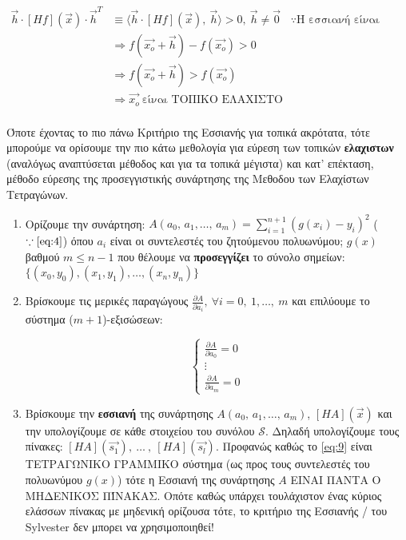 \documentclass[12pt]{article}
\begin{document}
\begin{align*}
\vec{h} \cdot [Hf](\vec{x}) \cdot \vec{h}^T &\equiv \langle \vec{h} \cdot [Hf](\vec{x}), \ \vec{h} \rangle > 0, \ \vec{h} \neq \vec{0}  & \because \text{Η εσσιανή είναι θετικά ορισμένη} \\  &\Rightarrow f(\vec{x_o}+\vec{h})-f(\vec{x_o})>0 \\
&\Rightarrow f(\vec{x_o}+\vec{h})>f(\vec{x_o}) \\
&\Rightarrow \vec{x_o} \ \text{είναι ΤΟΠΙΚΟ ΕΛΑΧΙΣΤΟ} \\
\end{align*}

    Όποτε έχοντας το πιο πάνω Κριτήριο της Εσσιανής για τοπικά ακρότατα,
τότε μπορούμε να ορίσουμε την πιο κάτω μεθολογία για εύρεση των τοπικών
\textbf{ελαχιστων} (αναλόγως αναπτύσεται μέθοδος και για τα τοπικά
μέγιστα) και κατ' επέκταση, μέθοδο εύρεσης της προσεγγιστικής συνάρτησης
της Μεθοδου των Ελαχίστων Τετραγώνων.

    

    \begin{enumerate}
\def\labelenumi{\arabic{enumi}.}
\item
  Ορίζουμε την συνάρτηση:
  \(A(a_0, \, a_1,\dots, \, a_m)=\sum_{i=1}^{n+1} (g(x_i)-y_i)^2\)
  (\(\because \eqref{eq:4}\)) όπου \(a_i\) είναι οι συντελεστές του
  ζητούμενου πολυωνύμου; \(g(x)\) βαθμού \(m\leq n-1\) που θέλουμε να
  \textbf{προσεγγίζει} το σύνολο σημείων:
  \(\{(x_0,y_0),(x_1,y_1),\dots,(x_{n},y_{n})\}\)
\item
  Βρίσκουμε τις μερικές παραγώγους
  \(\frac{\partial A}{\partial a_i}, \ \forall i=0, \ 1, \dots, \ m\)
  και επιλύουμε το σύστημα (\(m+1\))-εξισώσεων:

\[
  \begin{cases}
   \frac{\partial A}{\partial a_0}=0 \\
   \vdots \\
   \frac{\partial A}{\partial a_m} =0
   \end{cases}
  \nonumber \tag{Σ} \label{eq:9}
\]
\item
  Bρίσκουμε την \textbf{εσσιανή} της συνάρτησης \(A(a_0, \, a_1,\dots, \, 
  a_m)\), \([HA](\vec{x})\) και την υπολογίζουμε σε κάθε στοιχείου του 
  συνόλου \(\mathcal{S}\). Δηλαδή υπολογίζουμε τους πίνακες: \([HA]
  (\vec{s_1}), \ \dots \ , \  [HA](\vec{s_l})\). { Προφανώς καθώς το 
  \eqref{eq:9} είναι ΤΕΤΡΑΓΩΝΙΚΟ ΓΡΑΜΜΙΚΟ σύστημα (ως προς τους συντελεστές 
  του πολυωνύμου \(g(x)\)) τότε η Εσσιανή της συνάρτησης \(A\) ΕΙΝΑΙ ΠΑΝΤΑ Ο 
  ΜΗΔΕΝΙΚΌΣ ΠΊΝΑΚΑΣ. } Οπότε καθώς υπάρχει τουλάχιστον ένας κύριος ελάσσων 
  πίνακας με μηδενική ορίζουσα τότε, το κριτήριο της Εσσιανής / του 
  Sylvester δεν μπορει να χρησιμοποιηθεί!
\end{enumerate}
\end{document}

